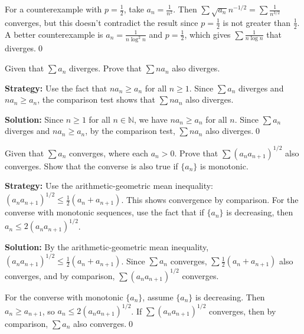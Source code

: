 For a counterexample with \(p = \frac{1}{2}\), take \(a_n = \frac{1}{n^2}\). Then \(\sum \sqrt{a_n} n^{-1/2} = \sum \frac{1}{n^{3/2}}\) converges, but this doesn't contradict the result since \(p = \frac{1}{2}\) is not greater than \(\frac{1}{2}\). A better counterexample is \(a_n = \frac{1}{n \log^2 n}\) and \(p = \frac{1}{2}\), which gives \(\sum \frac{1}{n \log n}\) that diverges.\qed



\begin{problembox}
Given that \(\sum a_n\) diverges. Prove that \(\sum n a_n\) also diverges.
\end{problembox}

\noindent\textbf{Strategy:} Use the fact that \(n a_n \geq a_n\) for all \(n \geq 1\). Since \(\sum a_n\) diverges and \(n a_n \geq a_n\), the comparison test shows that \(\sum n a_n\) also diverges.

\bigskip\noindent\textbf{Solution:}
Since \(n \geq 1\) for all \(n \in \mathbb{N}\), we have \(n a_n \geq a_n\) for all \(n\). Since \(\sum a_n\) diverges and \(n a_n \geq a_n\), by the comparison test, \(\sum n a_n\) also diverges.\qed



\begin{problembox}
Given that \(\sum a_n\) converges, where each \(a_n > 0\). Prove that \(\sum (a_n a_{n+1})^{1/2}\) also converges. Show that the converse is also true if \(\{a_n\}\) is monotonic.
\end{problembox}

\noindent\textbf{Strategy:} Use the arithmetic-geometric mean inequality: \((a_n a_{n+1})^{1/2} \leq \frac{1}{2}(a_n + a_{n+1})\). This shows convergence by comparison. For the converse with monotonic sequences, use the fact that if \(\{a_n\}\) is decreasing, then \(a_n \leq 2(a_n a_{n+1})^{1/2}\).

\bigskip\noindent\textbf{Solution:}
By the arithmetic-geometric mean inequality, \((a_n a_{n+1})^{1/2} \leq \frac{1}{2}(a_n + a_{n+1})\). Since \(\sum a_n\) converges, \(\sum \frac{1}{2}(a_n + a_{n+1})\) also converges, and by comparison, \(\sum (a_n a_{n+1})^{1/2}\) converges.

For the converse with monotonic \(\{a_n\}\), assume \(\{a_n\}\) is decreasing. Then \(a_n \geq a_{n+1}\), so \(a_n \leq 2(a_n a_{n+1})^{1/2}\). If \(\sum (a_n a_{n+1})^{1/2}\) converges, then by comparison, \(\sum a_n\) also converges.\qed




